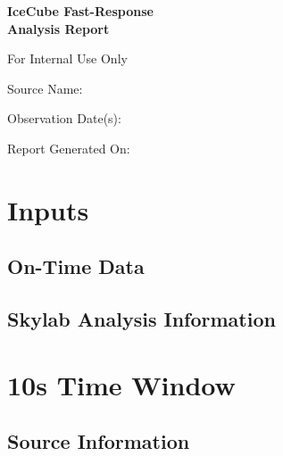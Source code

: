 \documentclass[titlepage]{article}
\begin{document}
\begin{titlepage}
  \centering
  \vspace{4cm}
  {\huge\bfseries IceCube Fast-Response \\ Analysis Report\par}
  \vspace{1cm}
  {\LARGE For Internal Use Only\par}
  \vfill
  {\Large Source Name: \\ \itshape\sourcename\par}
  \vspace{0.5cm}
  {\Large Observation Date(s):\\ \obsdate \par}
  \vfill
  \vspace{1cm} 
  {\Large Report Generated On:\\ \reportdate \par}
\end{titlepage}

\section{Inputs}
\subsection{On-Time Data}
\ontimetable
\subsection{Skylab Analysis Information}
\skylabtable 

\pagebreak
\section{10s Time Window}

\subsection{Source Information}
\sourcetable
\end{document}
